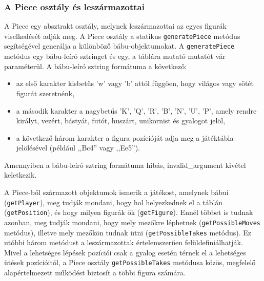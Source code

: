 \documentclass[12pt, twoside]{report}
\begin{document}
\subsubsection{A Piece osztály és leszármazottai}

A Piece egy absztrakt osztály, melynek leszármazottai  az egyes figurák viselkedését adják meg. A Piece osztály a statikus {\tt generatePiece} metódus segítségével generálja a különböző bábu-objektumokat. A {\tt generatePiece} metódus egy bábu-leíró sztringet és egy, a táblára mutató mutatót vár paraméterül. A bábu-leíró sztring formátuma a következő:
\begin{itemize}
	\item az első karakter kisbetűs 'w' vagy 'b' attól függően, hogy világos vagy sötét figurát szeretnénk,
	\item a második karakter a nagybetűs 'K', 'Q', 'R', 'B', 'N', 'U', 'P', amely rendre királyt, vezért, bástyát, futót, huszárt, unikornist és gyalogot jelöl,
	\item a következő három karakter a figura pozícióját adja meg a játéktábla jelölésével (például ,,Bc4'' vagy ,,Ee5'').
\end{itemize}
Amennyiben a bábu-leíró sztring formátuma hibás, invalid\_argument kivétel keletkezik.

A Piece-ből származott objektumok ismerik a játékost, amelynek bábui ({\tt getPlayer}), meg tudják mondani, hogy hol helyezkednek el a táblán ({\tt getPosition}), és hogy milyen figurák ők ({\tt getFigure}). Ennél többet is tudnak azonban, meg tudják mondani, hogy mely mezőkre léphetnek ({\tt getPossibleMoves} metódus), illetve mely mezőkön tudnak ütni ({\tt getPossibleTakes} metódus). Ez utóbbi három metódust a leszármazottak értelemszerűen felüldefiniálhatják. Mivel a lehetséges lépések pozíciói csak a gyalog esetén térnek el a lehetséges ütések pozícióitól, a Piece osztály {\tt getPossibleTakes} metódusa közös, megfelelő alapértelmezett működést biztosít a többi figura számára.
\end{document}
